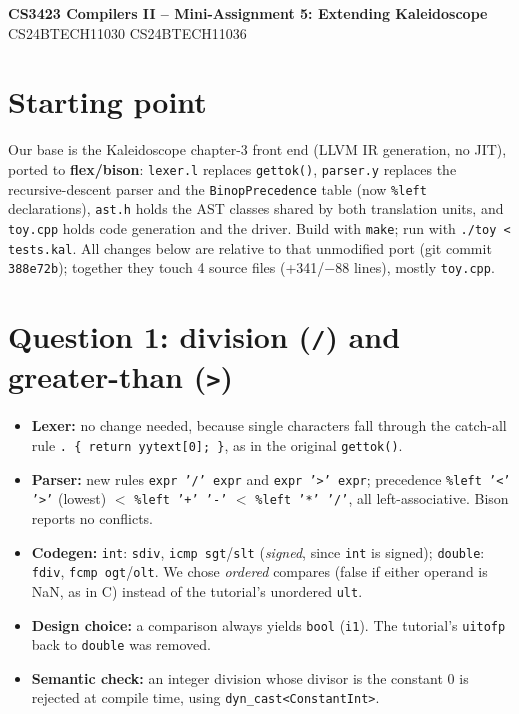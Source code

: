 \documentclass[10pt,a4paper]{article}
\newcommand{\code}[1]{\texttt{#1}}
\begin{document}
\sloppy

\begin{center}
{\Large\bfseries CS3423 Compilers II -- Mini-Assignment 5: Extending Kaleidoscope}\\[2pt]
CS24BTECH11030 \quad CS24BTECH11036
\end{center}

\section{Starting point}
Our base is the Kaleidoscope chapter-3 front end (LLVM IR generation, no JIT),
ported to \textbf{flex/bison}: \code{lexer.l} replaces \code{gettok()},
\code{parser.y} replaces the recursive-descent parser and the
\code{BinopPrecedence} table (now \code{\%left} declarations), \code{ast.h}
holds the AST classes shared by both translation units, and \code{toy.cpp}
holds code generation and the driver. Build with \code{make}; run with
\code{./toy < tests.kal}. All changes below are relative to that unmodified
port (git commit \code{388e72b}); together they touch 4 source files
(+341/$-$88 lines), mostly \code{toy.cpp}.

\section{Question 1: division (\code{/}) and greater-than (\code{>})}
\begin{itemize}
\item \textbf{Lexer:} no change needed, because single characters fall through the
  catch-all rule \code{.~\{ return yytext[0]; \}}, as in the original \code{gettok()}.
\item \textbf{Parser:} new rules \code{expr '/' expr} and \code{expr '>' expr};
  precedence \code{\%left '<' '>'} (lowest) $<$ \code{\%left '+' '-'} $<$
  \code{\%left '*' '/'}, all left-associative. Bison reports no conflicts.
\item \textbf{Codegen:} \code{int}: \code{sdiv}, \code{icmp sgt}/\code{slt}
  (\emph{signed}, since \code{int} is signed); \code{double}: \code{fdiv},
  \code{fcmp ogt}/\code{olt}. We chose \emph{ordered} compares (false if either
  operand is NaN, as in C) instead of the tutorial's unordered \code{ult}.
\item \textbf{Design choice:} a comparison always yields \code{bool} (\code{i1}).
  The tutorial's \code{uitofp} back to \code{double} was removed.
\item \textbf{Semantic check:} an integer division whose divisor is the constant
  0 is rejected at compile time, using \code{dyn\_cast<ConstantInt>}.
\end{itemize}
\end{document}
